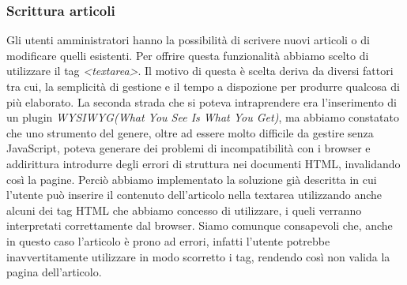 \documentclass[12pt]{article}
\begin{document}
	\subsubsection{Scrittura articoli}
	Gli utenti amministratori hanno la possibilità di scrivere nuovi articoli o di modificare quelli esistenti. Per offrire questa funzionalità abbiamo scelto di utilizzare il tag \emph{<textarea>}. Il motivo di questa è scelta deriva da diversi fattori tra cui, la semplicità di gestione e il tempo a dispozione per produrre qualcosa di più elaborato. La seconda strada che si poteva intraprendere era l'inserimento di un plugin \emph{WYSIWYG(What You See Is What You Get)}, ma abbiamo constatato che uno strumento del genere, oltre ad essere molto difficile da gestire senza JavaScript, poteva generare dei problemi di incompatibilità con i browser e addirittura introdurre degli errori di struttura nei documenti HTML, invalidando così la pagine. Perciò abbiamo implementato la soluzione già descritta in cui l'utente può inserire il contenuto dell'articolo nella textarea utilizzando anche alcuni dei tag HTML che abbiamo concesso di utilizzare, i queli verranno interpretati correttamente dal browser. Siamo comunque consapevoli che, anche in questo caso l'articolo è prono ad errori, infatti l'utente potrebbe inavvertitamente utilizzare in modo scorretto i tag, rendendo così non valida la pagina dell'articolo.
\end{document}
